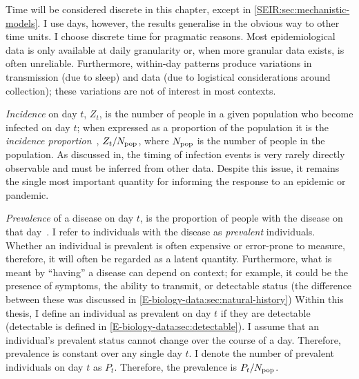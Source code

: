 \documentclass[thesis.tex]{subfiles}
\begin{document}
Time will be considered discrete in this chapter, except in \cref{SEIR:sec:mechanistic-models}.
I use days, however, the results generalise in the obvious way to other time units.
I choose discrete time for pragmatic reasons.
Most epidemiological data is only available at daily granularity or, when more granular data exists, is often unreliable.
Furthermore, within-day patterns produce variations in transmission (\eg due to sleep) and data (\eg due to logistical considerations around collection); these variations are not of interest in most contexts.

\emph{Incidence} on day $t$, $Z_t$, is the number of people in a given population who become infected on day $t$; when expressed as a proportion of the population it is the \emph{incidence proportion}~\autocite[89]{lashModern}, $Z_t/N_\text{pop}$, where $N_\text{pop}$ is the number of people in the population.
As discussed in, the timing of infection events is very rarely directly observable and must be inferred from other data.
Despite this issue, it remains the single most important quantity for informing the response to an epidemic or pandemic.

\emph{Prevalence} of a disease on day $t$, is the proportion of people with the disease on that day~\autocite[90]{lashModern}.
I refer to individuals with the disease as \emph{prevalent} individuals.
Whether an individual is prevalent is often expensive or error-prone to measure, therefore, it will often be regarded as a latent quantity.
Furthermore, what is meant by ``having'' a disease can depend on context; for example, it could be the presence of symptoms, the ability to transmit, or detectable status (the difference between these was discussed in \cref{E-biology-data:sec:natural-history})
Within this thesis, I define an individual as prevalent on day $t$ if they are detectable (detectable is defined in \cref{E-biology-data:sec:detectable}).
I assume that an individual's prevalent status cannot change over the course of a day.
Therefore, prevalence is constant over any single day $t$.
I denote the number of prevalent individuals on day $t$ as $P_t$.
Therefore, the prevalence is $P_t/N_\text{pop}$.
\end{document}
